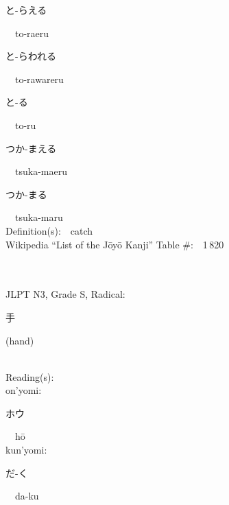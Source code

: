 \begin{multicols}{2}
{\hspace*{2em}}{\begin{CJK}{UTF8}{min} と-らえる \end{CJK}}\ \ to-raeru\ \ \\
{\hspace*{2em}}{\begin{CJK}{UTF8}{min} と-らわれる \end{CJK}}\ \ to-rawareru\ \ \\
{\hspace*{2em}}{\begin{CJK}{UTF8}{min} と-る \end{CJK}}\ \ to-ru\ \ \\
{\hspace*{2em}}{\begin{CJK}{UTF8}{min} つか-まえる \end{CJK}}\ \ tsuka-maeru\ \ \\
{\hspace*{2em}}{\begin{CJK}{UTF8}{min} つか-まる \end{CJK}}\ \ tsuka-maru\ \ \\
Definition(s):\ \ catch \\
Wikipedia ``List of the J\=oy\=o Kanji'' Table \#:\ \ 1\,820 \\
\ \ \\
{\fontsize{34pt}{40pt}  }\ \ \\  %
{JLPT N3, Grade S, Radical:\ \ {\begin{CJK}{UTF8}{min} 手 \end{CJK}} (hand) } \\
Reading(s):\ \ \\
{\hspace*{1em}}on'yomi:\ \ \\
{\hspace*{2em}}{\begin{CJK}{UTF8}{min} ホウ \end{CJK}}\ \ h\=o\ \ \\
{\hspace*{1em}}kun'yomi:\ \ \\
{\hspace*{2em}}{\begin{CJK}{UTF8}{min} だ-く \end{CJK}}\ \ da-ku\ \ \\

\end{multicols}
